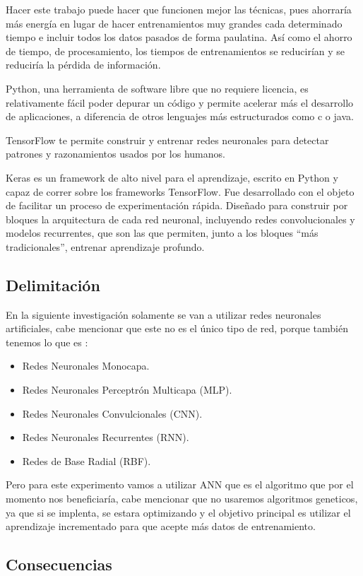 Hacer este trabajo puede hacer que funcionen mejor las técnicas, pues ahorraría más energía en lugar de hacer entrenamientos muy grandes cada determinado tiempo e incluir todos los datos pasados de forma paulatina. Así como el ahorro de tiempo, de procesamiento, los tiempos de entrenamientos se reducirían y se reduciría la pérdida de información.

Python, una herramienta de software libre que no requiere licencia, es relativamente fácil poder depurar un código y permite acelerar más el desarrollo de aplicaciones,  a diferencia de otros lenguajes más estructurados como c o java.

TensorFlow te permite construir y entrenar redes neuronales para detectar patrones y razonamientos usados por los humanos.

Keras es un framework de alto nivel para el aprendizaje, escrito en Python y capaz de correr sobre los frameworks TensorFlow. Fue desarrollado con el objeto de facilitar un proceso de experimentación rápida. Diseñado para construir por bloques la arquitectura de cada red neuronal, incluyendo redes convolucionales y modelos recurrentes, que son las que permiten, junto a los bloques “más tradicionales”, entrenar aprendizaje profundo.


\subsection{Delimitación}
    
    En la siguiente investigación solamente se van a utilizar redes neuronales artificiales, cabe mencionar que este no es el único tipo de red, porque también tenemos lo que es \cite{royo2021}:
    \begin{itemize}
        \item Redes Neuronales Monocapa.
        \item Redes Neuronales Perceptrón Multicapa (MLP).
        \item Redes Neuronales Convulcionales (CNN).
        \item Redes Neuronales Recurrentes (RNN).
        \item Redes de Base Radial (RBF).
    \end{itemize}
    Pero para este experimento vamos a utilizar ANN que es el algoritmo que por el momento nos beneficiaría, cabe mencionar que no usaremos algoritmos geneticos, ya que si se implenta, se estara
    optimizando y el objetivo principal es utilizar el aprendizaje incrementado para que acepte más datos de entrenamiento.

\subsection{Consecuencias}